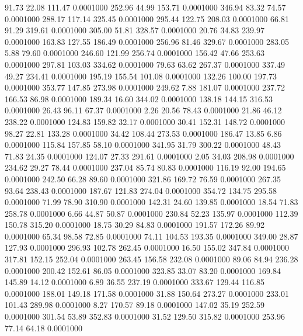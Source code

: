   91.73   22.08  111.47   0.0001000
 252.96   44.99  153.71   0.0001000
 346.94   83.32   74.57   0.0001000
 288.17  117.14  325.45   0.0001000
 295.44  122.75  208.03   0.0001000
  66.81   91.29  319.61   0.0001000
 305.00   51.81  328.57   0.0001000
  20.76   34.83  239.97   0.0001000
 163.83  127.55  186.49   0.0001000
 256.96   81.46  329.67   0.0001000
 283.05    5.88   79.60   0.0001000
 246.60  121.99  256.74   0.0001000
 156.42   47.66  253.63   0.0001000
 297.81  103.03  334.62   0.0001000
  79.63   63.62  267.37   0.0001000
 337.49   49.27  234.41   0.0001000
 195.19  155.54  101.08   0.0001000
 132.26  100.00  197.73   0.0001000
 353.77  147.85  273.98   0.0001000
 249.62    7.88  181.07   0.0001000
 237.72  166.53   86.98   0.0001000
 189.34   16.60  344.02   0.0001000
 138.18  144.15  316.53   0.0001000
  26.43   96.11   67.37   0.0001000
   2.26   20.56   78.43   0.0001000
  21.86   46.12  238.22   0.0001000
 124.83  159.82   32.17   0.0001000
  30.41  152.31  148.72   0.0001000
  98.27   22.81  133.28   0.0001000
  34.42  108.44  273.53   0.0001000
 186.47   13.85    6.86   0.0001000
 115.84  157.85   58.10   0.0001000
 341.95   31.79  300.22   0.0001000
  48.43   71.83   24.35   0.0001000
 124.07   27.33  291.61   0.0001000
   2.05   34.03  208.98   0.0001000
 234.62   29.27   78.44   0.0001000
 237.04   85.74   80.83   0.0001000
 116.19   92.00  194.65   0.0001000
 242.50   66.28   89.60   0.0001000
 321.86  169.72   76.59   0.0001000
 267.35   93.64  238.43   0.0001000
 187.67  121.83  274.04   0.0001000
 354.72  134.75  295.58   0.0001000
  71.99   78.90  310.90   0.0001000
 142.31   24.60  139.85   0.0001000
  18.54   71.83  258.78   0.0001000
   6.66   44.87   50.87   0.0001000
 230.84   52.23  135.97   0.0001000
 112.39  150.78  315.20   0.0001000
  18.75   30.29   84.83   0.0001000
 191.57  172.26   89.92   0.0001000
  65.34   98.58   72.85   0.0001000
  74.11  104.53  193.35   0.0001000
 349.00   28.87  127.93   0.0001000
 296.93  102.78  262.45   0.0001000
  16.50  155.02  347.84   0.0001000
 317.81  152.15  252.04   0.0001000
 263.45  156.58  232.08   0.0001000
  89.06   84.94  236.28   0.0001000
 200.42  152.61   86.05   0.0001000
 323.85   33.07   83.20   0.0001000
 169.84  145.89   14.12   0.0001000
   6.89   36.55  237.19   0.0001000
 333.67  129.44  116.85   0.0001000
 188.01  149.18  171.58   0.0001000
  31.88  150.64  273.27   0.0001000
 233.01  101.43  289.98   0.0001000
   8.27  170.57   89.18   0.0001000
 147.02   35.19  252.59   0.0001000
 301.54   53.89  352.83   0.0001000
  31.52  129.50  315.82   0.0001000
 253.96   77.14   64.18   0.0001000
